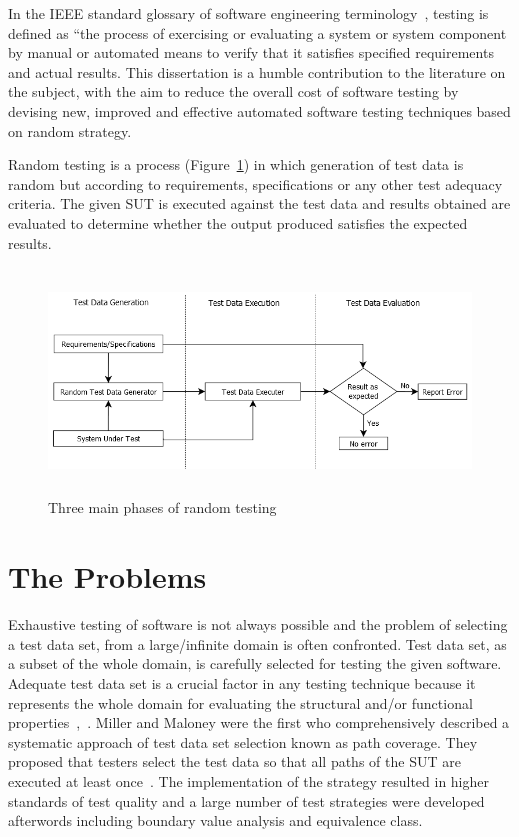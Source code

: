 In the IEEE standard glossary of software engineering terminology~\cite{american1984}, testing is defined as ``the process of exercising or evaluating a system or system component by manual or automated means to verify that it satisfies specified requirements and actual results. This dissertation is a humble contribution to the literature on the subject, with the aim to reduce the overall cost of software testing by devising new, improved and effective automated software testing techniques based on random strategy.

Random testing is a process (Figure~\ref{fig:SoftwareTesting}) in which generation of test data is random but according to requirements, specifications or any other test adequacy criteria. The given SUT is executed against the test data and results obtained are evaluated to determine whether the output produced satisfies the expected results.
\\
\begin{figure}[h]
	\centering
		\includegraphics[width=14cm, height=6cm ]{Introduction/SoftwareTesting.png}
		\caption{Three main phases of random testing}
	\label{fig:SoftwareTesting}
\end{figure}

\section{The Problems}
Exhaustive testing of software is not always possible and the problem of selecting a test data set, from a large/infinite domain is often confronted. Test data set, as a subset of the whole domain, is carefully selected for testing the given software. Adequate test data set is a crucial factor in any testing technique because it represents the whole domain for evaluating the structural and/or functional properties~\cite{howden1986},~\cite{mccabe1983}. Miller and Maloney were the first who comprehensively described a systematic approach of test data set selection known as path coverage. They proposed that testers select the test data so that all paths of the SUT are executed at least once~\cite{Miller1963}. The implementation of the strategy resulted in higher standards of test quality and a large number of test strategies were developed afterwords including boundary value analysis and equivalence class.

